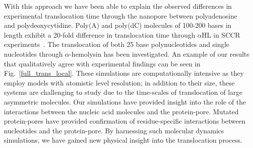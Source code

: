 \documentclass[a4paper,10pt]{article}
\newcommand{\atf}{A$_{25}$ }
\newcommand{\ahl}{$\alpha$HL }
\newcommand{\prim}{$^{\prime}$ }
\begin{document}


With this approach we have been able to explain the observed differences in experimental translocation time through the nanopore between polyadenosine and polydeoxycytidine. Poly(A) and poly(dC) molecules of 100-200 bases in length exhibit a 20-fold difference in translocation time through \ahl in SCCR experiments~\cite{akeson}. The translocation of both 25 base polynucleotides and single nucleotides through $\alpha$-hemolysin has been investigated. An example of our results that qualitatively agree with experimental findings can be seen in Fig.~\ref{full_trans_local}. These simulations are computationally intensive as they employ models with atomistic level resolution; in addition to their size, these systems are challenging to study due to the time-scales of translocation of large asymmetric molecules. Our simulations have provided insight into the role of the interactions between the nucleic acid molecules and the protein-pore. Mutated protein-pores have provided confirmation of residue-specific interactions between nucleotides and the protein-pore. By harnessing such molecular dynamics simulations, we have gained new physical insight into the translocation process.
\end{document}
